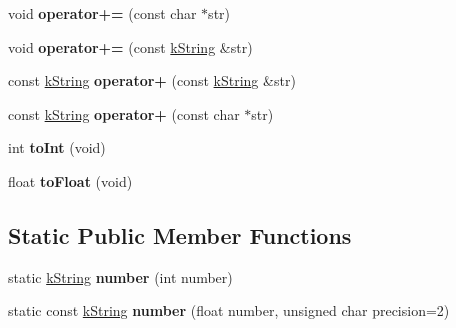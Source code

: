\begin{DoxyCompactItemize}
\item 
void {\bfseries operator+=} (const char $\ast$str)\hypertarget{classkString_a28831f6691370791b951e79607e3cac4}{}\label{classkString_a28831f6691370791b951e79607e3cac4}

\item 
void {\bfseries operator+=} (const \hyperlink{classkString}{k\+String} \&str)\hypertarget{classkString_a4cbf038b684ad999859193bf817c9ced}{}\label{classkString_a4cbf038b684ad999859193bf817c9ced}

\item 
const \hyperlink{classkString}{k\+String} {\bfseries operator+} (const \hyperlink{classkString}{k\+String} \&str)\hypertarget{classkString_a0e1b752818605ce0341c1147c3715cad}{}\label{classkString_a0e1b752818605ce0341c1147c3715cad}

\item 
const \hyperlink{classkString}{k\+String} {\bfseries operator+} (const char $\ast$str)\hypertarget{classkString_aebf22a94f69ca121c3421fc7a1bcb8ce}{}\label{classkString_aebf22a94f69ca121c3421fc7a1bcb8ce}

\item 
int {\bfseries to\+Int} (void)\hypertarget{classkString_a449a427129336d7a8c512e455c612080}{}\label{classkString_a449a427129336d7a8c512e455c612080}

\item 
float {\bfseries to\+Float} (void)\hypertarget{classkString_affa35f1556633e044cd19d8745ff8a82}{}\label{classkString_affa35f1556633e044cd19d8745ff8a82}

\end{DoxyCompactItemize}
\subsection*{Static Public Member Functions}
\begin{DoxyCompactItemize}
\item 
static \hyperlink{classkString}{k\+String} {\bfseries number} (int number)\hypertarget{classkString_ab4e1378470483b703ef29b700032860d}{}\label{classkString_ab4e1378470483b703ef29b700032860d}

\item 
static const \hyperlink{classkString}{k\+String} {\bfseries number} (float number, unsigned char precision=2)\hypertarget{classkString_a34bef8ee73be49f5d2151b3e0a51eab4}{}\label{classkString_a34bef8ee73be49f5d2151b3e0a51eab4}

\end{DoxyCompactItemize}
